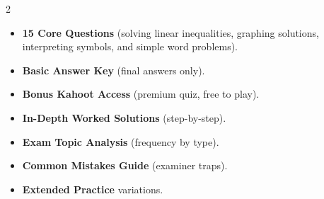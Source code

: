 \documentclass[11pt,a4paper]{article}
\newcommand{\FullReleaseDate}{April 30, 2026}
\begin{document}
\vspace{8pt}

\begin{multicols}{2}
  \begin{tcolorbox}[card, title=\sffamily\bfseries\textcolor{white}{\faHandPointDown\ TODAY (Simplified Version)}, colbacktitle=mainblue, boxed title style={sharp corners, boxrule=0pt}]
    \begin{itemize}[leftmargin=1.2em, itemsep=2pt]
      \item \small \textbf{15 Core Questions} (solving linear inequalities, graphing solutions, interpreting symbols, and simple word problems).
      \item \small \textbf{Basic Answer Key} (final answers only).
      \item \small \textbf{Bonus Kahoot Access} (premium quiz, free to play).
    \end{itemize}
  \end{tcolorbox}

  \columnbreak

  \begin{tcolorbox}[card, title=\sffamily\bfseries\textcolor{white}{\faRocket\ ON \FullReleaseDate\ (Full Upgrade)}, colbacktitle=mainblue, boxed title style={sharp corners, boxrule=0pt}]
    \begin{itemize}[leftmargin=1.2em, itemsep=2pt]
      \item \small \textbf{In-Depth Worked Solutions} (step-by-step).
      \item \small \textbf{Exam Topic Analysis} (frequency by type).
      \item \small \textbf{Common Mistakes Guide} (examiner traps).
      \item \small \textbf{Extended Practice} variations.
    \end{itemize}
  \end{tcolorbox}
\end{multicols}
\end{document}
